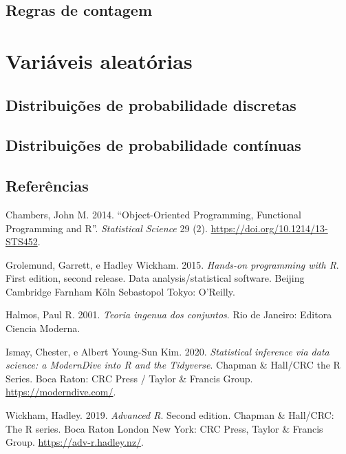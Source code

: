 \documentclass[
  letterpaper,
]{book}
\newlength{\cslhangindent}
\newenvironment{CSLReferences}[2] %
 {\begin{list}{}{%
  \setlength{\itemindent}{0pt}
  \setlength{\leftmargin}{0pt}
  \setlength{\parsep}{0pt}
  \ifodd #1
   \setlength{\leftmargin}{\cslhangindent}
   \setlength{\itemindent}{-1\cslhangindent}
  \fi
  \setlength{\itemsep}{#2\baselineskip}}}
 {\end{list}}
\theoremstyle{definition}
\theoremstyle{plain}
\theoremstyle{remark}
\begin{document}
\chapter{Regras de contagem}\label{regras-de-contagem}

\part{Variáveis aleatórias}

\chapter{Distribuições de probabilidade
discretas}\label{distribuiuxe7uxf5es-de-probabilidade-discretas}

\chapter{Distribuições de probabilidade
contínuas}\label{distribuiuxe7uxf5es-de-probabilidade-contuxednuas}


\chapter*{Referências}\label{referuxeancias}


\label{refs}
\begin{CSLReferences}{1}{0}
Chambers, John M. 2014. {``Object-{Oriented} {Programming}, {Functional}
{Programming} and {R}''}. \emph{Statistical Science} 29 (2).
\url{https://doi.org/10.1214/13-STS452}.

Grolemund, Garrett, e Hadley Wickham. 2015. \emph{Hands-on programming
with {R}}. First edition, second release. Data analysis/statistical
software. Beijing Cambridge Farnham Köln Sebastopol Tokyo: O'Reilly.

Halmos, Paul R. 2001. \emph{Teoria ingenua dos conjuntos}. Rio de
Janeiro: Editora Ciencia Moderna.

Ismay, Chester, e Albert Young-Sun Kim. 2020. \emph{Statistical
inference via data science: a {ModernDive} into {R} and the
{Tidyverse}}. Chapman \& {Hall}/{CRC} the {R} {Series}. Boca Raton: CRC
Press / Taylor \& Francis Group. \url{https://moderndive.com/}.

Wickham, Hadley. 2019. \emph{Advanced {R}}. Second edition. Chapman \&
{Hall}/{CRC}: {The} {R} series. Boca Raton London New York: CRC Press,
Taylor \& Francis Group. \url{https://adv-r.hadley.nz/}.

\end{CSLReferences}
\end{document}
